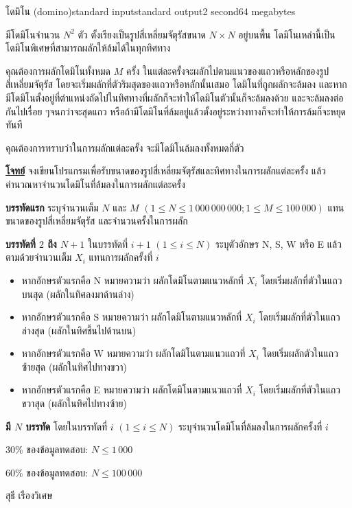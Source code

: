 \documentclass[11pt,a4paper]{article}
\begin{document}
\begin{problem}{โดมิโน (domino)}{standard input}{standard output}{2 second}{64 megabytes}

มีโดมิโนจำนวน $N^2 $ ตัว ตั้งเรียงเป็นรูปสี่เหลี่ยมจัตุรัสขนาด $N\times N$ อยู่บนพื้น โดมิโนเหล่านี้เป็นโดมิโนพิเศษที่สามารถผลักให้ล้มได้ในทุกทิศทาง

คุณต้องการผลักโดมิโนทั้งหมด $M$ ครั้ง ในแต่ละครั้งจะผลักไปตามแนวของแถวหรือหลักของรูปสี่เหลี่ยมจัตุรัส โดยจะเริ่มผลักที่ตัวริมสุดของแถวหรือหลักนั้นเสมอ โดมิโนที่ถูกผลักจะล้มลง และหากมีโดมิโนตั้งอยู่ที่ตำแหน่งถัดไปในทิศทางที่ผลักก็จะทำให้โดมิโนตัวนั้นก็จะล้มลงด้วย และจะล้มลงต่อกันไปเรื่อย ๆจนกว่าจะสุดแถว หรือถ้ามีโดมิโนที่ล้มอยู่แล้วตั้งอยู่ระหว่างทางก็จะทำให้การล้มก็จะหยุดทันที

คุณต้องการทราบว่าในการผลักแต่ละครั้ง จะมีโดมิโนล้มลงทั้งหมดกี่ตัว

\bigskip
\underline{\textbf{โจทย์}}  จงเขียนโปรแกรมเพื่อรับขนาดของรูปสี่เหลี่ยมจัตุรัสและทิศทางในการผลักแต่ละครั้ง แล้วคำนวณหาจำนวนโดมิโนที่ล้มลงในการผลักแต่ละครั้ง


\InputFile

\textbf{บรรทัดแรก} ระบุจำนวนเต็ม $N$ และ $M$ $(1 \leq N \leq 1\,000\,000\,000; 1 \leq M \leq 100\,000)$ แทนขนาดของรูปสี่เหลี่ยมจัตุรัส และจำนวนครั้งในการผลัก

\textbf{บรรทัดที่ $2$ ถึง $N+1$} ในบรรทัดที่ $i+1$ $(1 \leq i \leq N)$ ระบุตัวอักษร N, S, W หรือ E แล้วตามด้วยจำนวนเต็ม $X_i$ แทนการผลักครั้งที่ $i$
\begin{itemize}

\item หากอักษรตัวแรกคือ N หมายความว่า ผลักโดมิโนตามแนวหลักที่ $X_i$ โดยเริ่มผลักที่ตัวในแถวบนสุด (ผลักในทิศลงมาด้านล่าง)
\item หากอักษรตัวแรกคือ S หมายความว่า ผลักโดมิโนตามแนวหลักที่ $X_i$ โดยเริ่มผลักที่ตัวในแถวล่างสุด (ผลักในทิศขึ้นไปด้านบน)
\item หากอักษรตัวแรกคือ W หมายความว่า ผลักโดมิโนตามแนวแถวที่ $X_i$ โดยเริ่มผลักตัวในแถวซ้ายสุด (ผลักในทิศไปทางขวา)
\item หากอักษรตัวแรกคือ E หมายความว่า ผลักโดมิโนตามแนวแถวที่ $X_i$ โดยเริ่มผลักที่ตัวในแถวขวาสุด (ผลักในทิศไปทางซ้าย)


\end{itemize}
\OutputFile

\textbf{มี $N$ บรรทัด} โดยในบรรทัดที่ $i$ $(1 \leq i \leq N)$ ระบุจำนวนโดมิโนที่ล้มลงในการผลักครั้งที่ $i$

\Examples

\begin{example}
%
%
\end{example}

\Scoring

$30$\% ของข้อมูลทดสอบ: $N \leq 1\,000$

$60$\% ของข้อมูลทดสอบ: $N \leq 100\,000$

\Source

สุธี เรืองวิเศษ

\end{problem}
\end{document}
